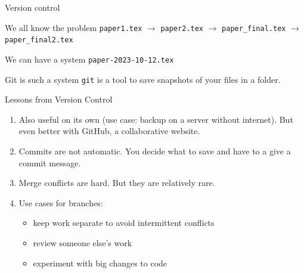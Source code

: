 \documentclass[
  ignorenonframetext,
  aspectratio=54,
]{beamer}
\providecommand{\tightlist}{%
  \setlength{\itemsep}{0pt}\setlength{\parskip}{0pt}}
\begin{document}
\begin{frame}[fragile]{Version control}
\protect\hypertarget{version-control}{}
\begin{block}{We all know the problem}
\protect\hypertarget{we-all-know-the-problem}{}
\texttt{paper1.tex} \(\to\) \texttt{paper2.tex} \(\to\)
\texttt{paper\_final.tex} \(\to\) \texttt{paper\_final2.tex}
\end{block}

\begin{block}{We can have a system}
\protect\hypertarget{we-can-have-a-system}{}
\texttt{paper-2023-10-12.tex}
\end{block}

\begin{block}{Git is such a system}
\protect\hypertarget{git-is-such-a-system}{}
\texttt{git} is a tool to save snapshots of your files in a folder.
\end{block}
\end{frame}

\begin{frame}{Lessons from Version Control}
\protect\hypertarget{lessons-from-version-control}{}
\begin{enumerate}
\tightlist
\item
  Also useful on its own (use case: backup on a server without
  internet). But even better with GitHub, a collaborative website.
\item
  Commits are not automatic. You decide what to save and have to a give
  a commit message.
\item
  Merge conflicts are hard. But they are relatively rare.
\item
  Use cases for branches:

  \begin{itemize}
  \tightlist
  \item
    keep work separate to avoid intermittent conflicts
  \item
    review someone else's work
  \item
    experiment with big changes to code
  \end{itemize}
\end{enumerate}
\end{frame}
\end{document}
